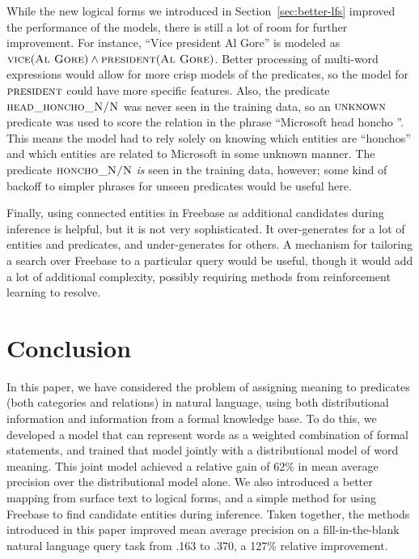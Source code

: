 \documentclass[11pt]{article}
\newcommand{\secref}[1]{Section~\ref{sec:#1}}
\newcommand{\blank}{\underline{\hspace{.5cm}}}
\newcommand{\predicate}[1]{\ensuremath{\textsc{#1}}}
\newcommand{\entity}[1]{\ensuremath{\textsc{#1}}}
\begin{document}
While the new logical forms we introduced in \secref{better-lfs} improved the
performance of the models, there is still a lot of room for further
improvement.  For instance, ``Vice president Al Gore'' is modeled as
$\predicate{vice}(\entity{Al Gore}) \land \predicate{president}(\entity{Al
Gore})$.  Better processing of multi-word expressions would allow for more
crisp models of the predicates, so the model for \predicate{president} could
have more specific features.  Also, the predicate \predicate{head\_honcho\_N/N}
was never seen in the training data, so an \predicate{unknown} predicate was
used to score the relation in the phrase ``Microsoft head honcho \blank{}''.
This means the model had to rely solely on knowing which entities are
``honchos'' and which entities are related to Microsoft in some unknown manner.
The predicate \predicate{honcho\_N/N} \emph{is} seen in the training data,
however; some kind of backoff to simpler phrases for unseen predicates would be
useful here.

Finally, using connected entities in Freebase as additional candidates during
inference is helpful, but it is not very sophisticated.  It over-generates for
a lot of entities and predicates, and under-generates for others.  A mechanism
for tailoring a search over Freebase to a particular query would be useful,
though it would add a lot of additional complexity, possibly requiring methods
from reinforcement learning to resolve.

\section{Conclusion}
\label{sec:conclusion}

In this paper, we have considered the problem of assigning meaning to
predicates (both categories and relations) in natural language, using both
distributional information and information from a formal knowledge base.  To do
this, we developed a model that can represent words as a weighted combination
of formal statements, and trained that model jointly with a distributional
model of word meaning.  This joint model achieved a relative gain of 62\% in
mean average precision over the distributional model alone.  We also introduced
a better mapping from surface text to logical forms, and a simple method for
using Freebase to find candidate entities during inference.  Taken together,
the methods introduced in this paper improved mean average precision on a
fill-in-the-blank natural language query task from .163 to .370, a 127\%
relative improvement.




\end{document}
